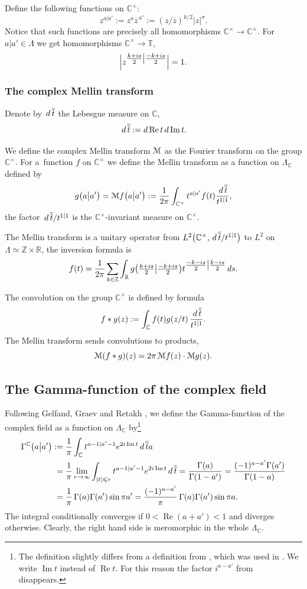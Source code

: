 \documentclass[11pt]{article}
\numberwithin{equation}{section}
\numberwithin{equation}{section}
\renewcommand{\Re}{\mathop {\mathrm {Re}}\nolimits}
\def\ov{\overline}
\renewcommand{\Re}{\mathop {\mathrm {Re}}\nolimits}
\renewcommand{\Im}{\mathop {\mathrm {Im}}\nolimits}
\def\R {{\mathbb R }}
\def\C {{\mathbb C }}
\def\Z{{\mathbb Z}}
\def\T{\mathbb T}
\def\cM{\EuScript M}
\def\le{\leqslant}
\newcommand{\dd}[1]{\,{\rm d}\,{\overline{\overline{#1}}} }
\begin{document}
Define the following functions on $\C^\times$:
\[
z^{a|a'}:= z^a \ov z^{\,a'}:= (z/\ov z)^{k/2} |z|^{\sigma}.
\]
Notice that such functions are precisely all homomorphisms
$\C^\times\to \C^\times$.
For $a|a'\in \Lambda$ we get homomorphisms $\C^\times\to \T$,
\[
\Big|z^{\tfrac{k+{\rm i}s}2\big|\tfrac{-k+{\rm i}s}2} \Big|=1.
\]

\subsubsection{The complex Mellin transform}
Denote by $\dd t$ the Lebesgue measure on $\C$,
\[
\dd t:= {\rm d}\Re t\, {\rm d}\Im t.
\]

We define the complex Mellin transform $\cM$ as the Fourier transform on the group $\C^\times$.
For a~function $f$ on $\C^\times$ we define the Mellin transform as a function
on $\Lambda_\C$ defined by
\[
g\big(a\big|a'\big)=
\cM f\big(a\big|a'\big):=\frac 1{2\pi}
\int_{\C^\times} t^{a|a'} f(t)\frac {\dd t}{t^{1|1}},
\]
the factor ${\dd t}/{t^{1|1}}$ is the $\C^\times$-invariant measure on $\C^\times$.

The Mellin transform is a unitary operator from
$L^2\big(\C^\times,{\dd t}/{t^{1|1}} \big)$
to $L^2$ on $\Lambda\simeq \Z\times\R$, the inversion formula is
\begin{equation*}
f(t)=\frac 1{2\pi}\sum_{k\in\Z} \int_\R g\big(\tfrac{k+{\rm i}s}2\big|\tfrac{-k+{\rm i}s}2\big) t^{{\tfrac{-k-{\rm i}s}2\big|\tfrac{k-{\rm i}s}2} }\,{\rm d}s.
\end{equation*}

The convolution on the group
$\C^\times$ is defined by formula
\[ f*g(z):=\int_\C f(t)g(z/t)\,\frac{\dd t}{t^{1|1}}.
\]
The Mellin transform sends convolutions to products,
\[
\cM (f*g)(z)=2\pi\, \cM f(z)\cdot \cM g(z).
\]

\subsection{The Gamma-function of the complex field}\label{ss:Gamma}
Following Gelfand, Graev and Retakh \cite{GGR},
we define the Gamma-function of the complex field as
a function on $\Lambda_\C$ by\footnote{The definition slightly
differs from a definition from \cite{GGR}, which was used in
\cite{MN,Ner-doug}. We write $\Im t$ instead of $\Re t$. For this reason
the factor $i^{a-a'}$ from \cite{GGR,MN} disappears.}
\begin{align}
\Gamma^\C\big(a\big|a'\big)&:=
\frac 1\pi \int_\C t^{a-1|a'-1} {\rm e}^{2{\rm i} \Im t}\dd ta \notag\\
&\hphantom{:}=
\frac{1}{\pi} \lim_{r\to\infty} \int_{|t|\le r} t^{a-1|a'-1}
{\rm e}^{2{\rm i} \Im t}\dd t
= \frac{\Gamma(a)}{\Gamma(1-a')}
=\frac{(-1)^{a-a'}\Gamma(a')}{\Gamma(1-a)} \notag \\
&\hphantom{:}= \frac{1}{\pi}\,
\Gamma(a)\Gamma(a')\sin\pi a'
= \frac{(-1)^{a-a'}}{\pi} \,\Gamma(a)\Gamma(a')\sin\pi a. \label{eq:Gamma}
\end{align}
The integral conditionally converges if $0<\Re(a+a')<1$
and diverges otherwise. Clearly, the right hand side is meromorphic
in the whole $\Lambda_\C$.
\end{document}
